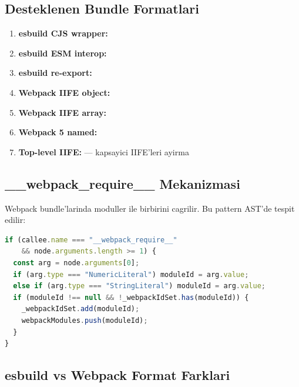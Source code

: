 \subsection{Desteklenen Bundle Formatlari}

\begin{enumerate}
\item \textbf{esbuild CJS wrapper:} 
\item \textbf{esbuild ESM interop:} 
\item \textbf{esbuild re-export:} 
\item \textbf{Webpack IIFE object:} 
\item \textbf{Webpack IIFE array:} \code{[function(e,t,n)\{...\}, ...]}
\item \textbf{Webpack 5 named:} 
\item \textbf{Top-level IIFE:}  --- kapsayici IIFE'leri ayirma
\end{enumerate}

\subsection{\_\_webpack\_require\_\_ Mekanizmasi}

Webpack bundle'larinda moduller  ile birbirini cagrilir. Bu pattern AST'de tespit edilir:

\begin{lstlisting}[language=JavaScript, caption={Webpack module tespiti -- deobfuscate.mjs}]
if (callee.name === "__webpack_require__"
    && node.arguments.length >= 1) {
  const arg = node.arguments[0];
  if (arg.type === "NumericLiteral") moduleId = arg.value;
  else if (arg.type === "StringLiteral") moduleId = arg.value;
  if (moduleId !== null && !_webpackIdSet.has(moduleId)) {
    _webpackIdSet.add(moduleId);
    webpackModules.push(moduleId);
  }
}
\end{lstlisting}

\subsection{esbuild vs Webpack Format Farklari}

